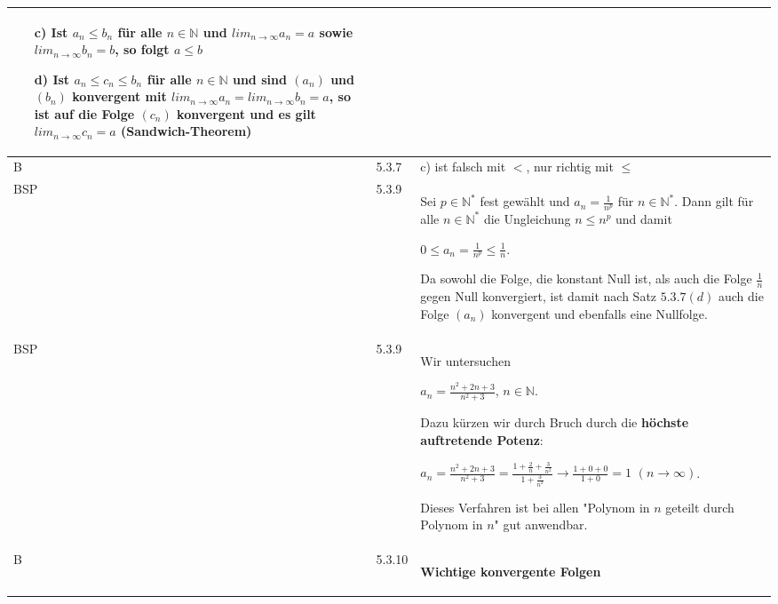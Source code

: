 \begin{longtable}{p{0.75cm} p{1cm} p{16cm}}
                        \begin{itemize}[topsep=-0.5cm]
                            \item[c)] Ist $a_n \leq b_n$ für alle $n \in \mathbb{N}$ und $lim_{n \rightarrow \infty} a_n = a$ sowie 
                                        $lim_{n \rightarrow \infty} b_n = b$, so folgt $a \leq b$
                            \item[d)] Ist $a_n \leq c_n \leq b_n$ für alle $n \in \mathbb{N}$ und sind $(a_n)$ und $(b_n)$ konvergent mit
                                        $lim_{n \rightarrow \infty} a_n = lim_{n \rightarrow \infty} b_n = a$, so ist auf die Folge $(c_n)$
                                        konvergent und es gilt $lim_{n \rightarrow \infty} c_n = a$ \hfill \break
                                        \textbf{(Sandwich-Theorem)} 
                        \end{itemize} \vspace{-0cm} \\
        \midrule
        B   & 5.3.7 &   c) ist falsch mit $<$, nur richtig mit $\leq$ \\
        \midrule
        BSP & 5.3.9 &   Sei $p \in \mathbb{N^*}$ fest gewählt und $a_n = \frac{1}{n^p}$ für $n \in \mathbb{N^*}$. Dann gilt für alle
                        $n \in \mathbb{N^*}$ die Ungleichung $n \leq n^p$ und damit \hfill \break
                        \centerline{$0 \leq a_n = \frac{1}{n^p} \leq \frac{1}n{}$.}
                        Da sowohl die Folge, die konstant Null ist, als auch die Folge $\frac{1}{n}$ gegen Null konvergiert,
                        ist damit nach Satz $5.3.7(d)$ auch die Folge $(a_n)$ konvergent und ebenfalls eine Nullfolge. \\
        \midrule
        BSP & 5.3.9 &   Wir untersuchen \hfill \break
                        \centerline{$a_n = \frac{n^2 + 2n + 3}{n^2 + 3}$, $n \in \mathbb{N}$.}
                        Dazu kürzen wir durch Bruch durch die \textbf{höchste auftretende Potenz}: \hfill \break
                        \centerline{$a_n = \frac{n^2 + 2n + 3}{n^2 + 3} = \frac{1 + \frac{2}{n} + \frac{3}{n^2}}{1 + \frac{3}{n^2}} \rightarrow 
                        \frac{1+0+0}{1+0} = 1$ $(n \rightarrow \infty)$.} 
                        Dieses Verfahren ist bei allen "Polynom in $n$ geteilt durch Polynom in $n$" gut anwendbar. \\
        \midrule
        B   & 5.3.10&   \textbf{Wichtige konvergente Folgen}
                            \begin{itemize}[topsep=-0.5cm]

\end{itemize}
\end{longtable}

